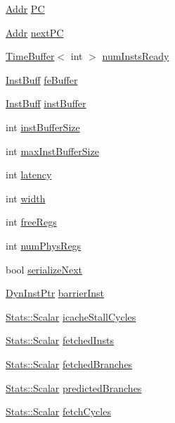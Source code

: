 \begin{DoxyCompactItemize}
\hyperlink{base_2types_8hh_af1bb03d6a4ee096394a6749f0a169232}{Addr} \hyperlink{classFrontEnd_ab4fee9d7e100be71a104b4b714909357}{PC}
\item 
\hyperlink{base_2types_8hh_af1bb03d6a4ee096394a6749f0a169232}{Addr} \hyperlink{classFrontEnd_a3bda64c96331af0ad914c5873b7074b5}{nextPC}
\item 
\hyperlink{classTimeBuffer}{TimeBuffer}$<$ int $>$ \hyperlink{classFrontEnd_a7e748ead7cabc60dbb73666b45a0cb18}{numInstsReady}
\item 
\hyperlink{classstd_1_1deque}{InstBuff} \hyperlink{classFrontEnd_ac7ded4b035e54069bf829087fd67c780}{feBuffer}
\item 
\hyperlink{classstd_1_1deque}{InstBuff} \hyperlink{classFrontEnd_ae82efc68a3059bd20d0dd5d8dbdd9d02}{instBuffer}
\item 
int \hyperlink{classFrontEnd_a4668a18dc57e1f433f756f8586c5ace7}{instBufferSize}
\item 
int \hyperlink{classFrontEnd_af676af949cf4321753cd6839d9d7e879}{maxInstBufferSize}
\item 
int \hyperlink{classFrontEnd_a9c5bf07170b5d91cfb44d4bfd0517128}{latency}
\item 
int \hyperlink{classFrontEnd_a2474a5474cbff19523a51eb1de01cda4}{width}
\item 
int \hyperlink{classFrontEnd_a6c1923b44f74e7cc11aeae29d9c1ec71}{freeRegs}
\item 
int \hyperlink{classFrontEnd_a57ec02581bb51a2421a7d401786beee5}{numPhysRegs}
\item 
bool \hyperlink{classFrontEnd_a7419c9cb2b5771ab5b23687a64c2af95}{serializeNext}
\item 
\hyperlink{classFrontEnd_a028ce10889c5f6450239d9e9a7347976}{DynInstPtr} \hyperlink{classFrontEnd_acf9d2aaec2de3b1c53dc1cce63de9794}{barrierInst}
\item 
\hyperlink{classStats_1_1Scalar}{Stats::Scalar} \hyperlink{classFrontEnd_a2b9328bdb1a6898bfae824981cd64311}{icacheStallCycles}
\item 
\hyperlink{classStats_1_1Scalar}{Stats::Scalar} \hyperlink{classFrontEnd_af0e3fa228032036d2022ed9e2a3612b6}{fetchedInsts}
\item 
\hyperlink{classStats_1_1Scalar}{Stats::Scalar} \hyperlink{classFrontEnd_aaca0646636cde96795aed6beb2942975}{fetchedBranches}
\item 
\hyperlink{classStats_1_1Scalar}{Stats::Scalar} \hyperlink{classFrontEnd_ae5c954036e76b5cc5a82cf7f17d4d5ed}{predictedBranches}
\item 
\hyperlink{classStats_1_1Scalar}{Stats::Scalar} \hyperlink{classFrontEnd_a9699b5489dd499e832651b96f95b5d19}{fetchCycles}

\end{DoxyCompactItemize}
